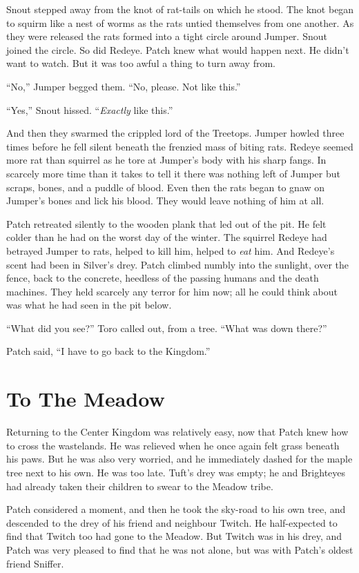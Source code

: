 \documentclass[12pt]{memoir}
\begin{document}
Snout stepped away from the knot of rat-tails on which he stood. The
knot began to squirm like a nest of worms as the rats untied
themselves from one another. As they were released the rats formed
into a tight circle around Jumper. Snout joined the circle. So did
Redeye. Patch knew what would happen next. He didn’t want to
watch. But it was too awful a thing to turn away from.

“No,” Jumper begged them. “No, please. Not like this.”

“Yes,” Snout hissed. “\textit{Exactly} like this.”

And then they swarmed the crippled lord of the Treetops. Jumper howled
three times before he fell silent beneath the frenzied mass of biting
rats. Redeye seemed more rat than squirrel as he tore at Jumper’s body
with his sharp fangs. In scarcely more time than it takes to tell it
there was nothing left of Jumper but scraps, bones, and a puddle of
blood. Even then the rats began to gnaw on Jumper’s bones and lick his
blood. They would leave nothing of him at all.

Patch retreated silently to the wooden plank that led out of the
pit. He felt colder than he had on the worst day of the winter. The
squirrel Redeye had betrayed Jumper to rats, helped to kill him,
helped to \textit{eat} him. And Redeye’s scent had been in Silver’s
drey. Patch climbed numbly into the sunlight, over the fence, back to
the concrete, heedless of the passing humans and the death
machines. They held scarcely any terror for him now; all he could
think about was what he had seen in the pit below.

“What did you see?” Toro called out, from a tree. “What was down
there?”

Patch said, “I have to go back to the Kingdom.”


\section{To The Meadow}

Returning to the Center Kingdom was relatively easy, now that Patch
knew how to cross the wastelands. He was relieved when he once again
felt grass beneath his paws. But he was also very worried, and he
immediately dashed for the maple tree next to his own. He was too
late. Tuft’s drey was empty; he and Brighteyes had already taken their
children to swear to the Meadow tribe.

Patch considered a moment, and then he took the sky-road to his own
tree, and descended to the drey of his friend and neighbour Twitch. He
half-expected to find that Twitch too had gone to the Meadow. But
Twitch was in his drey, and Patch was very pleased to find that he was
not alone, but was with Patch’s oldest friend Sniffer.
\end{document}
